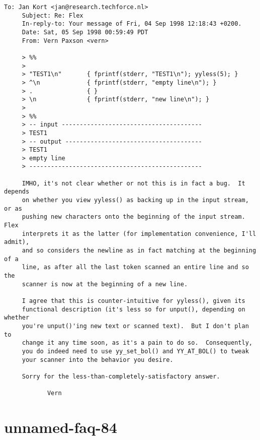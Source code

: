 \documentclass[openany,oneside]{book}
\begin{document}
\begin{verbatim}
To: Jan Kort <jan@research.techforce.nl>
     Subject: Re: Flex
     In-reply-to: Your message of Fri, 04 Sep 1998 12:18:43 +0200.
     Date: Sat, 05 Sep 1998 00:59:49 PDT
     From: Vern Paxson <vern>
     
     > %%
     >
     > "TEST1\n"       { fprintf(stderr, "TEST1\n"); yyless(5); }
     > ^\n             { fprintf(stderr, "empty line\n"); }
     > .               { }
     > \n              { fprintf(stderr, "new line\n"); }
     >
     > %%
     > -- input ---------------------------------------
     > TEST1
     > -- output --------------------------------------
     > TEST1
     > empty line
     > ------------------------------------------------
     
     IMHO, it's not clear whether or not this is in fact a bug.  It depends
     on whether you view yyless() as backing up in the input stream, or as
     pushing new characters onto the beginning of the input stream.  Flex
     interprets it as the latter (for implementation convenience, I'll admit),
     and so considers the newline as in fact matching at the beginning of a
     line, as after all the last token scanned an entire line and so the
     scanner is now at the beginning of a new line.
     
     I agree that this is counter-intuitive for yyless(), given its
     functional description (it's less so for unput(), depending on whether
     you're unput()'ing new text or scanned text).  But I don't plan to
     change it any time soon, as it's a pain to do so.  Consequently,
     you do indeed need to use yy_set_bol() and YY_AT_BOL() to tweak
     your scanner into the behavior you desire.
     
     Sorry for the less-than-completely-satisfactory answer.
     
     		Vern
\end{verbatim}

\section{unnamed-faq-84}
\end{document}
